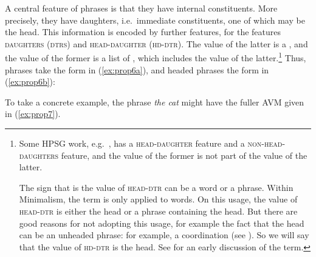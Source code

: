 \documentclass[output=paper
	        ,collection
	        ,collectionchapter
 	        ,biblatex
                ,babelshorthands
                ,newtxmath
                ,draftmode
                ,colorlinks, citecolor=brown
]{langscibook}
\begin{document}
A central feature of phrases is that they have internal constituents. More precisely, they have
daughters, i.e.\ immediate constituents, one of which may be the head. This information is encoded
by further features, for \citet[29]{GSag2000a-u} the features \textsc{daughters} (\textsc{dtrs}) and
\textsc{head-daughter} (\textsc{hd-dtr}). The value of the latter is a , and the value of
the former is a list of , which includes the value of the latter.\footnote{%
  Some HPSG work, e.g.\ \citet{Sag97a}, has a \textsc{head-daughter} feature and a
  \textsc{non-head-daughters} feature, and the value of the former is not part of the value of the
  latter.  

  The sign that is the value of \textsc{head-dtr} can be a word or a phrase. Within Minimalism, the
  term  is only applied to words. On this usage, the value of \textsc{head-dtr} is either
  the head or a phrase containing the head. But there are good reasons for not adopting this usage,
  for example the fact that the head can be an unheaded phrase: for example, a coordination (see
  ). So we will say that the
  value of \textsc{hd-dtr} is the head. See \citet[30]{Jackendoff77a} for an early discussion of the
  term.}
%
Thus, phrases take the form in (\ref{ex:prop6a}), and headed phrases the form in (\ref{ex:prop6b}):

\begin{multicols}{2}
\eal\label{ex:prop6}
\ex\label{ex:prop6a}

\columnbreak
\ex\label{ex:prop6b}
\zl
{}
\end{multicols}
%
To take a concrete example, the phrase \emph{the cat} might have the fuller AVM given in (\ref{ex:prop7}).

\ea\label{ex:prop7}
\z
\end{document}
